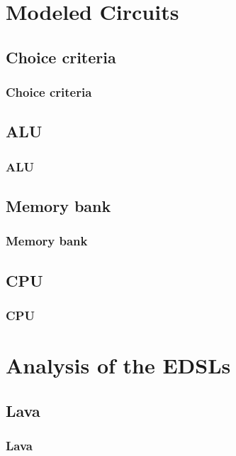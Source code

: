 \documentclass{beamer}
\begin{document}
    \section{Modeled Circuits}
    \label{sec:modeled-circuits}
        \frame{\sectionpage}

        \subsection{Choice criteria}
        \label{subsec:circuit-choice-criteria}
            \begin{frame}
                \frametitle{Choice criteria}
            \end{frame}

        \subsection{ALU}
        \label{subsec:alu}
            \begin{frame}
                \frametitle{ALU}
            \end{frame}

        \subsection{Memory bank}
        \label{subsec:memory-bank}
            \begin{frame}
                \frametitle{Memory bank}
            \end{frame}

        \subsection{CPU}
        \label{subsec:cpu}
            \begin{frame}
                \frametitle{CPU}
            \end{frame}


    \section{Analysis of the EDSLs}
    \label{sec:analysis-of-the-edsls}
        \frame{\sectionpage}

        \subsection{Lava}
        \label{subsec:lava}
            \begin{frame}
                \frametitle{Lava}
            \end{frame}
\end{document}
